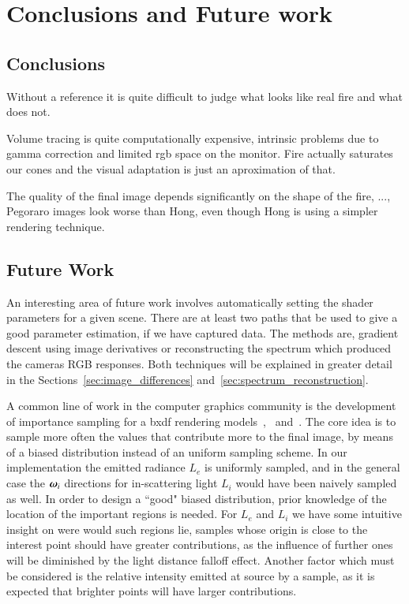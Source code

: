 \chapter{Conclusions and Future work}
\label{ch:conclusions}

\section{Conclusions}

Without a reference it is quite difficult to judge what looks like real fire and what does not.

Volume tracing is quite computationally expensive, intrinsic problems due to gamma correction and limited rgb space on the monitor.
Fire actually saturates our cones and the visual adaptation is just an aproximation of that.

The quality of the final image depends significantly on the shape of the fire, ..., Pegoraro images look worse than Hong, even though Hong is using a simpler rendering technique.

 

\section{Future Work}

An interesting area of future work involves automatically setting the shader parameters for a given scene.
There are at least two paths that be used to give a good parameter estimation, if we have captured data.
The methods are, gradient descent using image derivatives or reconstructing the spectrum which produced the cameras RGB responses.
Both techniques will be explained in greater detail in the Sections~\ref{sec:image_differences} and~\ref{sec:spectrum_reconstruction}.

A common line of work in the computer graphics community is the development of importance sampling for a bxdf rendering models~\cite{Lawrence:2004},~\cite{Ou:2012} and~\cite{Wang:2014}.
The core idea is to sample more often the values that contribute more to the final image, by means of a biased distribution instead of an uniform sampling scheme.
In our implementation the emitted radiance $L_e$ is uniformly sampled, and in the general case the $\boldsymbol{\omega}_i$ directions for in-scattering light $L_i$ would have been naively sampled as well.
In order to design a ``good" biased distribution, prior knowledge of the location of the important regions is needed. 
For $L_e$ and $L_i$ we have some intuitive insight on were would such regions lie, samples whose origin is close to the interest point should have greater contributions, as the influence of further ones will be diminished by the light distance falloff effect.
Another factor which must be considered is the relative intensity emitted at source by a sample, as it is expected that brighter points will have larger contributions. 

